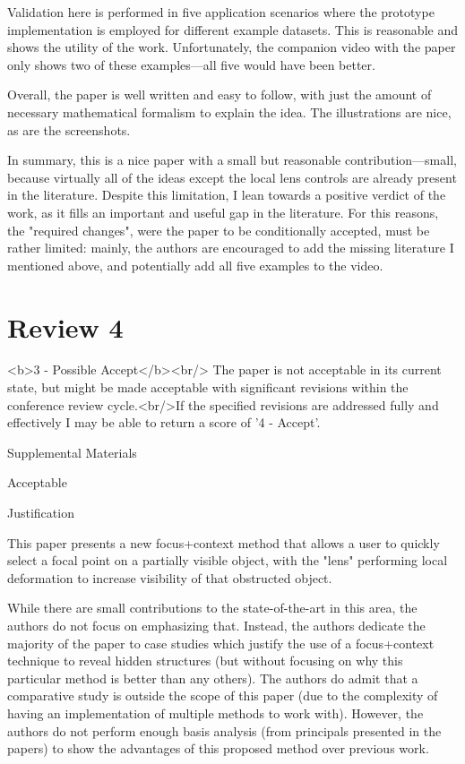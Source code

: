 \documentclass[a4paper,10pt]{article}
\begin{document}
    Validation here is performed in five application scenarios where the prototype
    implementation is employed for different example datasets. This is reasonable and
    shows the utility of the work. Unfortunately, the companion video with the paper
    only shows two of these examples---all five would have been better.

    Overall, the paper is well written and easy to follow, with just the amount of
    necessary mathematical formalism to explain the idea. The illustrations are nice,
    as are the screenshots.

    In summary, this is a nice paper with a small but reasonable contribution---small,
    because virtually all of the ideas except the local lens controls are already
    present in the literature. Despite this limitation, I lean towards a positive
    verdict of the work, as it fills an important and useful gap in the literature.
    For this reasons, the "required changes", were the paper to be conditionally
    accepted, must be rather limited: mainly, the authors are encouraged to add the
    missing literature I mentioned above, and potentially add all five examples to the
    video.
    
    

\section{Review 4}

<b>3 - Possible Accept</b><br/> The paper is not acceptable in its current state,
    but might be made acceptable with significant revisions within the conference
    review cycle.<br/>If the specified revisions are addressed fully and effectively I
    may be able to return a score of '4 - Accept'.

  Supplemental Materials

    Acceptable

  Justification

    This paper presents a new focus+context method that allows a user to quickly
    select a focal point on a partially visible object, with the "lens" performing
    local deformation to increase visibility of that obstructed object.

    While there are small contributions to the state-of-the-art in this area, the
    authors do not focus on emphasizing that. Instead, the authors dedicate the
    majority of the paper to case studies which justify the use of a focus+context
    technique to reveal hidden structures (but without focusing on why this particular
    method is better than any others). The authors do admit that a comparative study
    is outside the scope of this paper (due to the complexity of having an
    implementation of multiple methods to work with). However, the authors do not
    perform enough basis analysis (from principals presented in the papers) to show
    the advantages of this proposed method over previous work.
\end{document}
